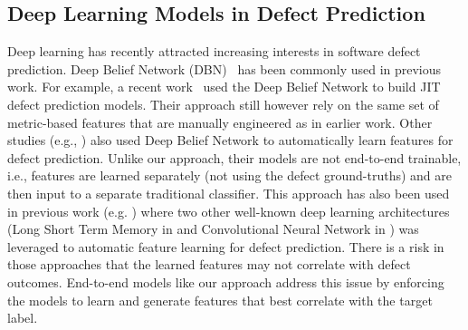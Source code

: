 

\subsection{Deep Learning Models in Defect Prediction}

Deep learning has recently attracted increasing interests in software defect prediction. Deep Belief Network (DBN)~\cite{hinton2006reducing} has been commonly used in previous work. For example, a recent work~\cite{Yang:2015:DLJ}  used the Deep Belief Network to build JIT defect prediction models. Their approach still however rely on the same set of metric-based features that are manually engineered as in earlier work. Other studies (e.g., \cite{Yang:2015:DLJ,Wang:2016:ALS,WangTSE2018}) also used Deep Belief Network to automatically learn features for defect prediction. Unlike our approach, their models are not end-to-end trainable, i.e., features are learned separately (not using the defect ground-truths) and are then input to a separate traditional classifier. This approach has also been used in previous work (e.g. \cite{Li2017,HoaTSE2019}) where two other well-known deep learning architectures (Long Short Term Memory in \cite{HoaTSE2019}  and Convolutional Neural Network in \cite{Li2017}) was leveraged to automatic feature learning for defect prediction. There is a risk in those approaches that the learned features may not correlate with defect outcomes. End-to-end models like our approach address this issue by enforcing the models to learn and generate features that best correlate with the target label.





